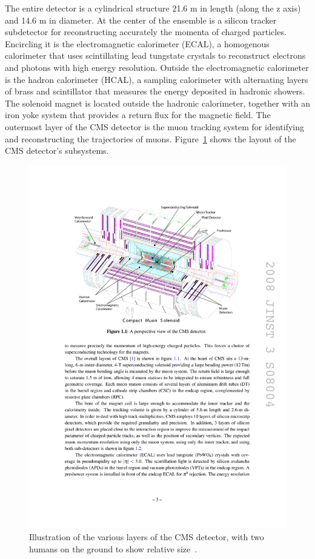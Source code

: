 The entire detector is a cylindrical structure 21.6 m in length (along the z axis) and 14.6 m in diameter. At the center of the ensemble is a silicon tracker subdetector for reconstructing accurately the momenta of charged particles. Encircling it is the electromagnetic calorimeter (ECAL), a homogenous calorimeter that uses scintillating lead tungstate crystals to reconstruct electrons and photons with high energy resolution. Outside the electromagnetic calorimeter is the hadron calorimeter (HCAL), a sampling calorimeter with alternating layers of brass and scintillator that measures the energy deposited in hadronic showers. The solenoid magnet is located outside the hadronic calorimeter, together with an iron yoke system that provides a return flux for the magnetic field. The outermost layer of the CMS detector is the muon tracking system for identifying and reconstructing the trajectories of muons. Figure~\ref{fig:cms} shows the layout of the CMS detector's subsystems.

\begin{figure}[hbtp]
  \begin{center}
    \includegraphics[width=2.0\cmsFigWidth]{figures/wholeCMS}
    \caption{Illustration of the various layers of the CMS detector, with two humans on the ground to show relative size~\cite{1748-0221-3-08-S08004}.}
    \label{fig:cms}
  \end{center}
\end{figure}

